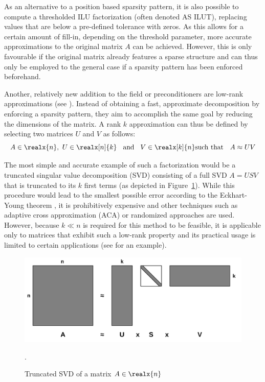 As an alternative to a position based sparsity pattern, it is also possible to compute a thresholded ILU factorization (often denoted AS ILUT), replacing values that are below a pre-defined tolerance with zeros. As this allows for a certain amount of fill-in, depending on the threshold parameter, more accurate approximations to the original matrix $A$ can be achieved. However, this is only favourable if the original matrix already features a sparse structure and can thus only be employed to the general case if a sparsity pattern has been enforced beforehand.

Another, relatively new addition to the field or preconditioners are low-rank approximations (see \cite{markovsky_low_2011}). Instead of obtaining a fast, approximate decomposition by enforcing a sparsity pattern, they aim to accomplish the same goal by reducing the dimensions of the matrix. A rank $k$ approximation can thus be defined by selecting two matrices $U$ and $V$ as follows:
\begin{equation}
    A \in \realx{n}\text{,}\:\; U \in \realx[n]{k}\;\; \text{ and }\;\; V \in \realx[k]{n}
    \text{such that }\;\ A \approx UV
\end{equation}

\noindent The most simple and accurate example of such a factorization would be a truncated singular value decomposition (SVD) consisting of a full SVD $A=USV$ that is truncated to its $k$ first terms (as depicted in Figure~\hyperref[fig:svd]{\ref{fig:svd}}). While this procedure would lead to the smallest possible error according to the Eckhart-Young theorem \cite{eckart_approximation_1936}, it is prohibitively expensive and other techniques such as adaptive cross approximation (ACA) \cite{rjasanow_adaptive_2000} or randomized approaches \cite{martinsson_randomized_2019} are used. However, because $k \ll n$ is required for this method to be feasible, it is applicable only to matrices that exhibit such a low-rank property and its practical usage is limited to certain applications (see \cite{higham_new_2019} for an example).

\begin{figure}[h]
    \centering
    \includegraphics[width=0.7\linewidth]{chapters/3_solvers/3_2_iterative_solvers/figures/SVD.pdf}
    \caption{Truncated SVD of a matrix $A \in \realx{n}$}.
    \label{fig:svd}
\end{figure}

